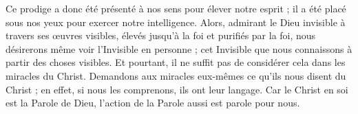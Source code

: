 Ce prodige a donc été présenté à nos sens pour élever notre esprit ; il a été placé sous nos yeux pour exercer notre intelligence. Alors, admirant le Dieu invisible à travers ses œuvres visibles, élevés jusqu’à la foi et purifiés par la foi, nous désirerons même voir l’Invisible en personne ; cet Invisible que nous connaissons à partir des choses visibles. Et pourtant, il ne suffit pas de considérer cela dans les miracles du Christ. Demandons aux miracles eux-mêmes ce qu’ils nous disent du Christ ; en effet, si nous les comprenons, ils ont leur langage. Car le Christ en soi est la Parole de Dieu, l’action de la Parole aussi est parole pour nous.
